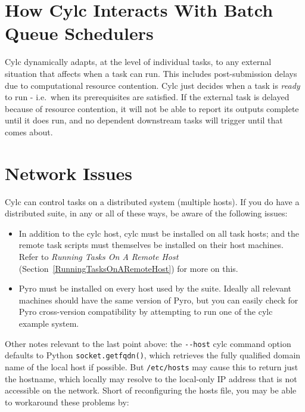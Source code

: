 \documentclass[11pt,a4paper]{article}
\begin{document}
\section{How Cylc Interacts With Batch Queue Schedulers}
\label{HowCylcInteractsWithBatchQueueSchedulers}

Cylc dynamically adapts, at the level of individual tasks, to any
external situation that affects when a task can run. This includes
post-submission delays due to computational resource contention. Cylc
just decides when a task is {\em ready} to run - i.e.\ when its
prerequisites are satisfied.  If the external task is delayed because of
resource contention, it will not be able to report its outputs complete
until it does run, and no dependent downstream tasks will trigger until
that comes about.



\section{Network Issues}

Cylc can control tasks on a distributed system (multiple hosts).  If you
do have a distributed suite, in any or all of these ways, be aware of
the following issues: 

\begin{itemize}

    \item In addition to the cylc host, cylc must be installed on all
        task hosts; and the remote task scripts must
        themselves be installed on their host machines.  Refer to {\em
        Running Tasks On A Remote Host}
        (Section~\ref{RunningTasksOnARemoteHost}) for more on this.

    \item Pyro must be installed on every host used by the suite.
         Ideally all relevant machines should have the same version of
         Pyro, but you can easily check for Pyro cross-version
         compatibility by attempting to run one of the cylc example
         system.
        
\end{itemize}

Other notes relevant to the last point above: the \lstinline=--host=
cylc command option defaults to Python \lstinline=socket.getfqdn()=,
which retrieves the fully qualified domain name of the local host
if possible.  But \lstinline=/etc/hosts= may cause this to return
just the hostname, which locally may resolve to the local-only IP
address that is not accessible on the network.  Short of reconfiguring
the hosts file, you may be able to workaround these problems by:
\end{document}
